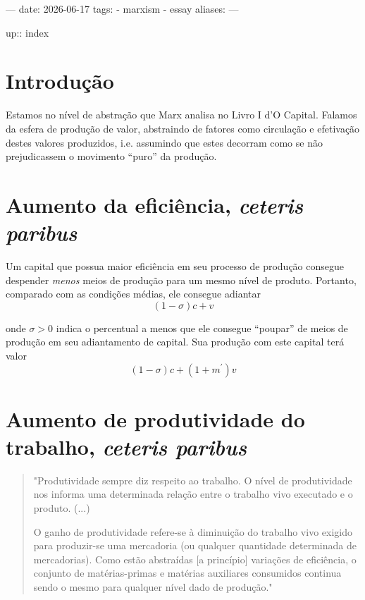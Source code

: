 ---
date: 2026-06-17
tags:
  - marxism
  - essay
aliases:
---

up:: index

\section{Introdução}
Estamos no nível de abstração que Marx analisa no Livro I d'O Capital. Falamos da esfera de produção de valor, abstraindo de fatores como circulação e efetivação destes valores produzidos, i.e. assumindo que estes decorram como se não prejudicassem o movimento ``puro'' da produção. 

\section{Aumento da eficiência, \textit{ceteris paribus}}
Um capital que possua maior eficiência em seu processo de produção consegue despender \textit{menos} meios de produção para um mesmo nível de produto. Portanto, comparado com as condições médias, ele consegue adiantar 
$$
(1-\sigma)c + v
$$

onde $\sigma>0$ indica o percentual a menos que ele consegue ``poupar'' de meios de produção em seu adiantamento de capital. Sua produção com este capital terá valor
$$
(1-\sigma)c + (1+m^{\prime})v
$$


\section{Aumento de produtividade do trabalho, \textit{ceteris paribus}}
\begin{quote}
"Produtividade sempre diz respeito ao trabalho. O nível de produtividade nos informa uma determinada relação entre o trabalho vivo executado e o produto. (...)

O ganho de produtividade refere-se à diminuição do trabalho vivo exigido para produzir-se uma mercadoria (ou qualquer quantidade determinada de mercadorias). Como estão abstraídas [a princípio] variações de eficiência, o conjunto de matérias-primas e matérias auxiliares consumidos continua sendo o mesmo para qualquer nível dado de produção." \parencite[p. 233]{SaBarreto2021a}
\end{quote}

